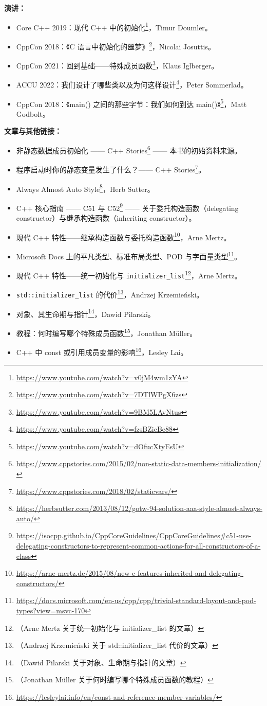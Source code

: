 \textbf{演讲：}

\begin{itemize}
\item Core C++ 2019：现代 C++ 中的初始化\footnote{\url{https://www.youtube.com/watch?v=v0jM4wm1zYA}}，Timur Doumler。
\item CppCon 2018：《C 语言中初始化的噩梦》\footnote{\url{https://www.youtube.com/watch?v=7DTlWPgX6zs}}，Nicolai Josuttis。
\item CppCon 2021：回到基础——特殊成员函数\footnote{\url{https://www.youtube.com/watch?v=9BM5LAvNtus}}，Klaus Iglberger。
\item ACCU 2022：我们设计了哪些类以及为何这样设计\footnote{\url{https://www.youtube.com/watch?v=fzsBZicBe88}}，Peter Sommerlad。
\item CppCon 2018：《main() 之间的那些字节：我们如何到达 main()》\footnote{\url{https://www.youtube.com/watch?v=dOfucXtyEsU}}，Matt Godbolt。
\end{itemize}

\textbf{文章与其他链接：}

\begin{itemize}
\item 非静态数据成员初始化 —— C++ Stories\footnote{\url{https://www.cppstories.com/2015/02/non-static-data-members-initialization/}} —— 本书的初始资料来源。
\item 程序启动时你的静态变量发生了什么？—— C++ Stories\footnote{\url{https://www.cppstories.com/2018/02/staticvars/}}。
\item Always Almost Auto Style\footnote{\url{https://herbsutter.com/2013/08/12/gotw-94-solution-aaa-style-almost-always-auto/}}，Herb Sutter。
\item C++ 核心指南 —— C51 与 C52\footnote{\url{https://isocpp.github.io/CppCoreGuidelines/CppCoreGuidelines\#c51-use-delegating-constructors-to-represent-common-actions-for-all-constructors-of-a-class}} —— 关于委托构造函数（delegating constructor）与继承构造函数（inheriting constructor）。
\item 现代 C++ 特性——继承构造函数与委托构造函数\footnote{\url{https://arne-mertz.de/2015/08/new-c-features-inherited-and-delegating-constructors/}}，Arne Mertz。
\item Microsoft Docs 上的平凡类型、标准布局类型、POD 与字面量类型\footnote{\url{https://docs.microsoft.com/en-us/cpp/cpp/trivial-standard-layout-and-pod-types?view=msvc-170}}。
\item 现代 C++ 特性——统一初始化与 \texttt{initializer\_list}\footnote{（Arne Mertz 关于统一初始化与 initializer\_list 的文章）}，Arne Mertz。
\item \texttt{std::initializer\_list} 的代价\footnote{（Andrzej Krzemieński 关于 std::initializer\_list 代价的文章）}，Andrzej Krzemieński。
\item 对象、其生命期与指针\footnote{（Dawid Pilarski 关于对象、生命期与指针的文章）}，Dawid Pilarski。
\item 教程：何时编写哪个特殊成员函数\footnote{（Jonathan Müller 关于何时编写哪个特殊成员函数的教程）}，Jonathan Müller。
\item C++ 中 const 或引用成员变量的影响\footnote{\url{https://lesleylai.info/en/const-and-reference-member-variables/}}，Lesley Lai。
\end{itemize}
